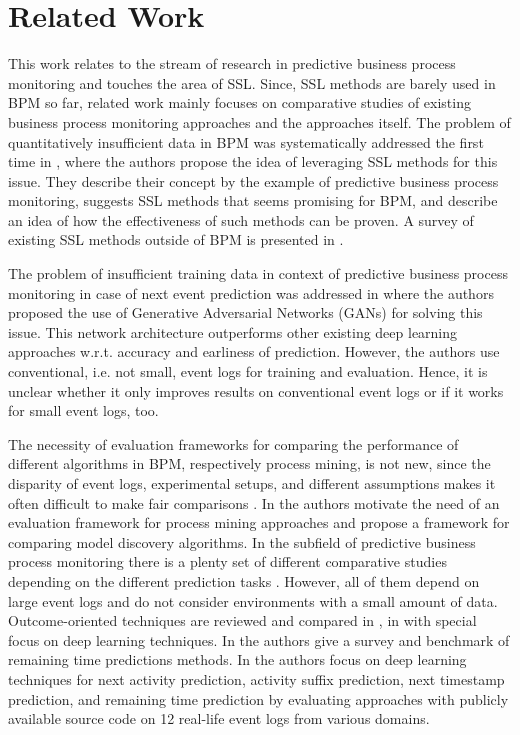 \documentclass[runningheads]{llncs}
\begin{document}
\section{Related Work}\label{Sec:Related-Work}
\vspace{-8pt}
This work relates to the stream of research in predictive business process monitoring and touches the area of SSL. Since, SSL methods are barely used in BPM so far, related work mainly focuses on comparative studies of existing business process monitoring approaches and the approaches itself. The problem of quantitatively insufficient data in BPM was systematically addressed the first time in \cite{Kaeppel2020SSL}, where the authors propose the idea of leveraging SSL methods for this issue. They describe their concept by the example of predictive business process monitoring, suggests SSL methods that seems promising for BPM, and describe an idea of how the effectiveness of such methods can be proven. A survey of existing SSL methods outside of BPM is presented in \cite{Shu2018}.

The problem of insufficient training data in context of predictive business process monitoring in case of next event prediction was addressed in \cite{Taymouri2020} where the authors proposed the use of Generative Adversarial Networks (GANs) for solving this issue. This network architecture outperforms other existing deep learning approaches w.r.t. accuracy and earliness of prediction. However, the authors use conventional, i.e. not small, event logs for training and evaluation. Hence, it is unclear whether it only improves results on conventional event logs or if it works for small event logs, too.

The necessity of evaluation frameworks for comparing the performance of different algorithms in BPM, respectively process mining, is not new, since the disparity of event logs, experimental setups, and different assumptions makes it often difficult to make fair comparisons \cite{RamaManeiro2020,Metzger2015}. In \cite{Rozinat2007} the authors motivate the need of an evaluation framework for process mining approaches and propose a framework for comparing model discovery algorithms. In the subfield of predictive business process monitoring there is a plenty set of different comparative studies depending on the different prediction tasks \cite{RamaManeiro2020,Kratsch,TeinemaaBenchmark,francescomarino2018,Verenich2019}. However, all of them depend on large event logs and do not consider environments with a small amount of data. Outcome-oriented techniques are reviewed and compared in \cite{TeinemaaBenchmark}, in \cite{Kratsch} with special focus on deep learning techniques. In \cite{Verenich2019} the authors give a survey and benchmark of remaining time predictions methods. In \cite{RamaManeiro2020} the authors focus on deep learning techniques for next activity prediction, activity suffix prediction, next timestamp prediction, and remaining time prediction by evaluating approaches with publicly available source code on 12 real-life event logs from various domains. 
\end{document}
